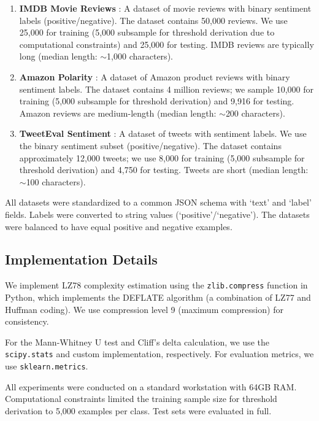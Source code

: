 \documentclass[11pt,letterpaper]{article}
\begin{document}
\begin{enumerate}
  \item \textbf{IMDB Movie Reviews} \cite{Maas2011}: A dataset of movie reviews with binary sentiment labels (positive/negative). The dataset contains 50,000 reviews. We use 25,000 for training (5,000 subsample for threshold derivation due to computational constraints) and 25,000 for testing. IMDB reviews are typically long (median length: $\sim$1,000 characters).

  \item \textbf{Amazon Polarity} \cite{Zhang2015}: A dataset of Amazon product reviews with binary sentiment labels. The dataset contains 4 million reviews; we sample 10,000 for training (5,000 subsample for threshold derivation) and 9,916 for testing. Amazon reviews are medium-length (median length: $\sim$200 characters).

  \item \textbf{TweetEval Sentiment} \cite{Barbieri2020}: A dataset of tweets with sentiment labels. We use the binary sentiment subset (positive/negative). The dataset contains approximately 12,000 tweets; we use 8,000 for training (5,000 subsample for threshold derivation) and 4,750 for testing. Tweets are short (median length: $\sim$100 characters).
\end{enumerate}

All datasets were standardized to a common JSON schema with `text' and `label' fields. Labels were converted to string values (`positive'/`negative'). The datasets were balanced to have equal positive and negative examples.

\subsection{Implementation Details}

We implement LZ78 complexity estimation using the \texttt{zlib.compress} function in Python, which implements the DEFLATE algorithm (a combination of LZ77 and Huffman coding). We use compression level 9 (maximum compression) for consistency.

For the Mann-Whitney U test and Cliff's delta calculation, we use the \texttt{scipy.stats} and custom implementation, respectively. For evaluation metrics, we use \texttt{sklearn.metrics}.

All experiments were conducted on a standard workstation with 64GB RAM. Computational constraints limited the training sample size for threshold derivation to 5,000 examples per class. Test sets were evaluated in full.
\end{document}
